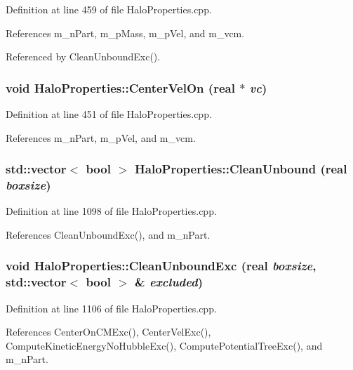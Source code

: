 Definition at line 459 of file HaloProperties.cpp.



References m\_\-nPart, m\_\-pMass, m\_\-pVel, and m\_\-vcm.



Referenced by CleanUnboundExc().

\subsubsection[{CenterVelOn}]{\setlength{\rightskip}{0pt plus 5cm}void HaloProperties::CenterVelOn ({\bf real} $\ast$ {\em vc})}\label{classHaloProperties_a1584267a0d3b6f3469bad5ead7428b94}


Definition at line 451 of file HaloProperties.cpp.



References m\_\-nPart, m\_\-pVel, and m\_\-vcm.

\subsubsection[{CleanUnbound}]{\setlength{\rightskip}{0pt plus 5cm}std::vector$<$ bool $>$ HaloProperties::CleanUnbound ({\bf real} {\em boxsize})}\label{classHaloProperties_a28b060c3347429056b28f7f2e7603b48}


Definition at line 1098 of file HaloProperties.cpp.



References CleanUnboundExc(), and m\_\-nPart.

\subsubsection[{CleanUnboundExc}]{\setlength{\rightskip}{0pt plus 5cm}void HaloProperties::CleanUnboundExc ({\bf real} {\em boxsize}, \/  std::vector$<$ bool $>$ \& {\em excluded})}\label{classHaloProperties_acb0b10b15c1312b9431c498875a8d3f4}


Definition at line 1106 of file HaloProperties.cpp.



References CenterOnCMExc(), CenterVelExc(), ComputeKineticEnergyNoHubbleExc(), ComputePotentialTreeExc(), and m\_\-nPart.



